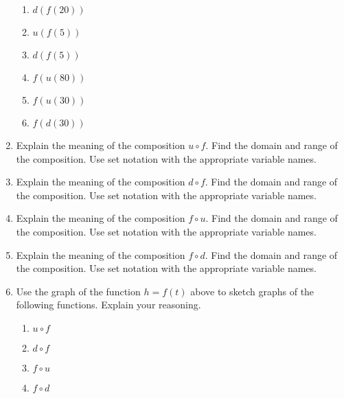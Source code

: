 \documentclass{ximera}
\begin{document}
\begin{exploration}
\begin{enumerate}
\begin{enumerate}
\item $d(f(20))$

\item $u(f(5))$

\item $d(f(5))$

\item $f(u(80))$

\item $f(u(30))$

\item $f(d(30))$

\end{enumerate}

\item Explain the meaning of the composition $u\circ f$. Find the domain and range of the composition. Use set notation with the appropriate variable names.

\item Explain the meaning of the composition $d\circ f$. Find the domain and range of the composition. Use set notation with the appropriate variable names.

\item Explain the meaning of the composition $f\circ u$. Find the domain and range of the composition. Use set notation with the appropriate variable names.

\item Explain the meaning of the composition $f\circ d$. Find the domain and range of the composition. Use set notation with the appropriate variable names.

\item Use the graph of the function $h=f(t)$ above to sketch graphs of the following functions. Explain your reasoning.

\begin{enumerate}
\item $u\circ f$

\item $d\circ f$

\item $f\circ u$

\item $f\circ d$

\end{enumerate}

\end{enumerate}

\end{exploration}
\end{document}
